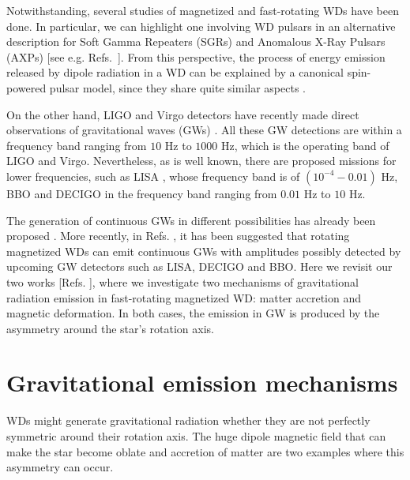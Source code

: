 \documentclass{ws-procs961x669}            %
\begin{document}
Notwithstanding, several studies of magnetized and fast-rotating WDs have been done. In particular, we can highlight one involving WD pulsars in an alternative description for Soft Gamma Repeaters (SGRs) and Anomalous X-Ray Pulsars (AXPs) [see e.g. Refs.~]. From this perspective, the process of energy emission released by dipole radiation in a WD can be explained by a canonical spin-powered pulsar model, since they share quite similar aspects \cite{Usov/1988,Coelho/2014}.

On the other hand, LIGO and Virgo detectors have recently made direct observations of gravitational waves (GWs) \cite{abbott2019gwtc,abbott2021gwtc}. All these GW detections are within a frequency band ranging from $10$ Hz to $1000$ Hz, which is the operating band of LIGO and Virgo. Nevertheless, as is well known, there are proposed missions for lower frequencies, such as LISA \cite{Amaro/2017,cornish2018}, whose frequency band is of $(10^{-4}-0.01)$ Hz, BBO \cite{harry/2006,yagi2011} and DECIGO \cite{kawamura/2006,yagi2017} in the frequency band ranging from $0.01$ Hz to $10$ Hz.

The generation of continuous GWs in different possibilities has already been proposed \cite{1996A&A...312..675B,2016JCAP...07..023D,2016ApJ...831...35D,2017EPJC...77..350D,Schramm/2017}. More recently, in Refs. , it has been suggested that rotating magnetized WDs can emit continuous GWs with amplitudes possibly detected by upcoming GW detectors such as LISA, DECIGO and BBO. Here we revisit our two works [Refs. ], where we investigate two mechanisms of gravitational radiation emission in fast-rotating magnetized WD: matter accretion and magnetic deformation. In both cases, the emission in GW is produced by the asymmetry around the star's rotation axis.



\section{Gravitational emission mechanisms  }
\label{aba:sec2}

WDs might generate gravitational radiation whether they are not perfectly symmetric around their rotation axis. The huge dipole magnetic field that can make the star become oblate \cite{chandrasekhar1953s} and accretion of matter are two examples where this asymmetry can occur.
\end{document}
